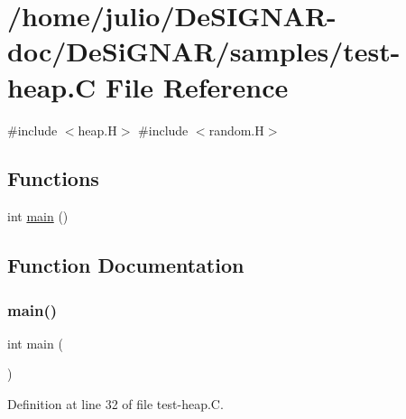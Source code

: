 \hypertarget{test-heap_8_c}{}\section{/home/julio/\+De\+S\+I\+G\+N\+A\+R-\/doc/\+De\+Si\+G\+N\+A\+R/samples/test-\/heap.C File Reference}
\label{test-heap_8_c}
{\ttfamily \#include $<$heap.\+H$>$}\newline
{\ttfamily \#include $<$random.\+H$>$}\newline
\subsection*{Functions}
\begin{DoxyCompactItemize}
\item 
int \hyperlink{test-heap_8_c_ae66f6b31b5ad750f1fe042a706a4e3d4}{main} ()
\end{DoxyCompactItemize}


\subsection{Function Documentation}
\mbox{\label{test-heap_8_c_ae66f6b31b5ad750f1fe042a706a4e3d4}} 
\subsubsection{\texorpdfstring{main()}{main()}}
{\footnotesize\ttfamily int main (\begin{DoxyParamCaption}{ }\end{DoxyParamCaption})}



Definition at line 32 of file test-\/heap.\+C.


